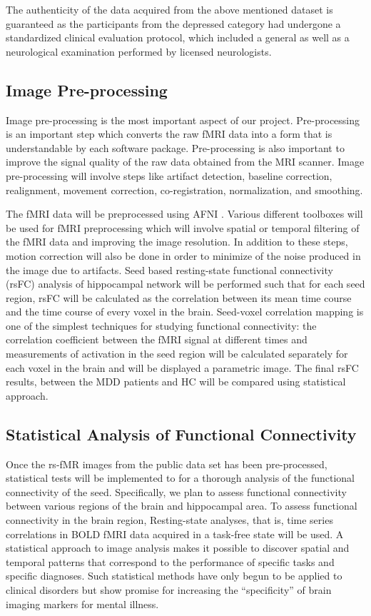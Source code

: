 ﻿\documentclass[12pt]{article}
\begin{document}
The authenticity of the data acquired from the above mentioned dataset
is guaranteed as the participants from the depressed category had
undergone a standardized clinical evaluation protocol, which included
a general as well as a neurological examination performed by licensed
neurologists.

\newpage
\subsection{Image Pre-processing}

Image pre-processing is the most important aspect of our
project. Pre-processing is an important step which converts the raw
fMRI data into a form that is understandable by each software package.
Pre-processing is also important to improve the signal quality of the
raw data obtained from the MRI scanner. Image pre-processing will
involve steps like artifact detection, baseline correction,
realignment, movement correction, co-registration, normalization, and
smoothing.

The fMRI data will be preprocessed using AFNI \cite{coxafni}. Various
different toolboxes will be used for fMRI preprocessing which will
involve spatial or temporal filtering of the fMRI data and improving
the image resolution. In addition to these steps, motion correction
will also be done in order to minimize of the noise produced in the
image due to artifacts. Seed based resting-state functional
connectivity (rsFC) analysis of hippocampal network will be performed
such that for each seed region, rsFC will be calculated as the
correlation between its mean time course and the time course of every
voxel in the brain. Seed-voxel correlation mapping is one of the
simplest techniques for studying functional connectivity: the
correlation coefficient between the fMRI signal at different times and
measurements of activation in the seed region will be calculated
separately for each voxel in the brain and will be displayed
a parametric image. The final rsFC results, between the MDD patients
and HC will be compared using statistical approach.

\subsection{Statistical Analysis of Functional Connectivity}

\enlargethispage{\baselineskip}
\vspace{-5pt}
Once the rs-fMR images from the public data set has been
pre-processed, statistical tests will be implemented to for a thorough
analysis of the functional connectivity of the seed. Specifically, we
plan to assess functional connectivity between various regions of the
brain and hippocampal area. To assess functional connectivity in the
brain region, Resting-state analyses, that is, time series
correlations in BOLD fMRI data acquired in a task-free state will be
used. A statistical approach to image analysis makes it possible to
discover spatial and temporal patterns that correspond to the
performance of specific tasks and specific diagnoses. Such statistical
methods have only begun to be applied to clinical disorders but show
promise for increasing the ``specificity'' of brain imaging markers
for mental illness.
\end{document}

